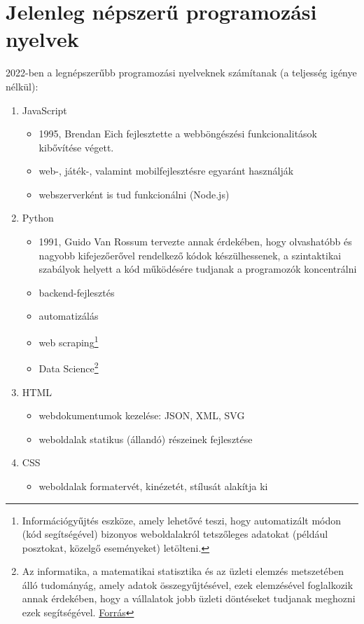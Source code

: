 \documentclass[tocnopagenum]{thesis-ekf}
\theoremstyle{definition}
\theoremstyle{remark}
\begin{document}
	\section{Jelenleg népszerű programozási nyelvek}
	2022-ben a legnépszerűbb programozási nyelveknek számítanak (a teljesség igénye nélkül):
	\begin{enumerate}
		\item JavaScript
		\begin{itemize}
			\item 1995, Brendan Eich fejlesztette a webböngészési funkcionalitások kibővítése végett.
			\item web-, játék-, valamint mobilfejlesztésre egyaránt használják
			\item webszerverként is tud funkcionálni (Node.js)
		\end{itemize}
		\item Python
		\begin{itemize}
			\item 1991, Guido Van Rossum tervezte annak érdekében, hogy olvashatóbb és nagyobb kifejezőerővel rendelkező kódok készülhessenek, a szintaktikai szabályok helyett a kód működésére tudjanak a programozók koncentrálni
			\item backend-fejlesztés
			\item automatizálás
			\item web scraping\footnote{Információgyűjtés eszköze, amely lehetővé teszi, hogy automatizált módon (kód segítségével) bizonyos weboldalakról tetszőleges adatokat (például posztokat, közelgő eseményeket) letölteni.}
			\item Data Science\footnote{Az informatika, a matematikai statisztika és az üzleti elemzés metszetében álló tudományág, amely adatok összegyűjtésével, ezek elemzésével foglalkozik annak érdekében, hogy a vállalatok jobb üzleti döntéseket tudjanak meghozni ezek segítségével. \hyperref{https://qr.ae/pvlYmQ}{}{}{Forrás}}
		\end{itemize}
		\item HTML
		\begin{itemize}
			\item webdokumentumok kezelése: JSON, XML, SVG
			\item weboldalak statikus (állandó) részeinek fejlesztése
		\end{itemize}
		\item CSS 
		\begin{itemize}
			\item weboldalak formatervét, kinézetét, stílusát alakítja ki

\end{itemize}
\end{enumerate}
\end{document}
